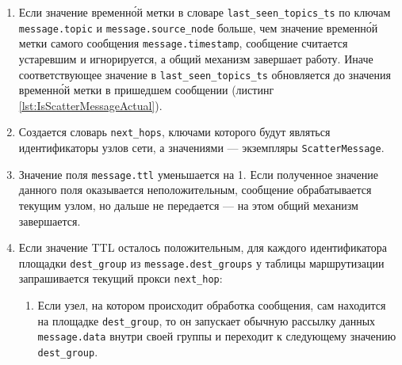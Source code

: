 \begin{enumerate}
    \item Если значение временн\'{о}й метки в словаре \texttt{last\_seen\_to\-pics\_ts} по ключам \texttt{mes\-sage.to\-pic} и \texttt{mes\-sage.source\_node} больше, чем значение временн\'{о}й метки самого сообщения \texttt{message.timestamp}, сообщение считается устаревшим и игнорируется, а общий механизм завершает работу. Иначе соответствующее значение в \texttt{last\_seen\_topics\_ts} обновляется до значения временн\'{о}й метки в пришедшем сообщении (листинг \ref{lst:IsScatterMessageActual}).


    \item Создается словарь \texttt{next\_hops}, ключами которого будут являться идентификаторы узлов сети, а значениями --- экземпляры \texttt{ScatterMessage}.
    
    \item Значение поля \texttt{message.ttl} уменьшается на 1. Если полученное значение данного поля оказывается неположительным, сообщение обрабатывается текущим узлом, но дальше не передается --- на этом общий механизм завершается.
    
    \item Если значение TTL осталось положительным, для каждого идентификатора площадки \texttt{dest\_group} из \texttt{message.dest\_groups} у таблицы маршрутизации запрашивается текущий прокси \texttt{next\_hop}:
    
    \begin{enumerate}
        \item Если узел, на котором происходит обработка сообщения, сам находится на площадке \texttt{dest\_group}, то он запускает обычную рассылку данных \texttt{message.data} внутри своей группы и переходит к следующему значению \texttt{dest\_group}.
    

\end{enumerate}
\end{enumerate}
